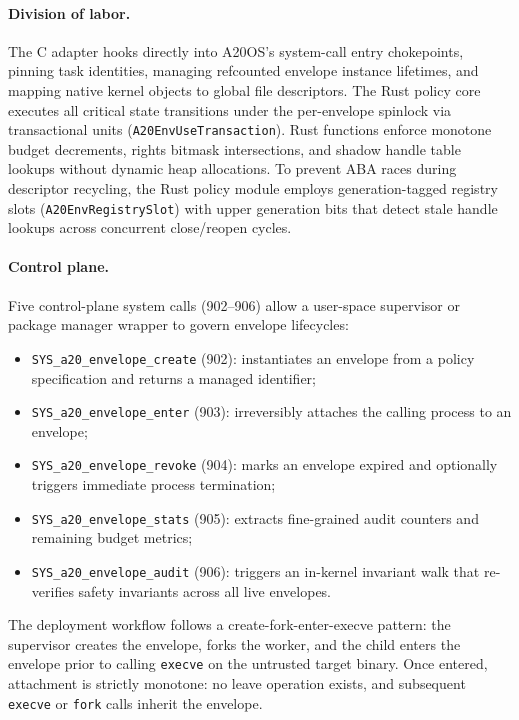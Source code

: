 \documentclass[letterpaper,twocolumn,10pt]{article}
\begin{document}
\paragraph{Division of labor.}
The C adapter hooks directly into A20OS's system-call entry chokepoints, pinning
task identities, managing refcounted envelope instance lifetimes, and mapping
native kernel objects to global file descriptors.  The Rust policy core
executes all critical state transitions under the per-envelope spinlock
via transactional units (\texttt{A20EnvUseTransaction}).  Rust functions enforce
monotone budget decrements, rights bitmask intersections, and shadow handle
table lookups without dynamic heap allocations.  To prevent ABA races during
descriptor recycling, the Rust policy module employs generation-tagged
registry slots (\texttt{A20EnvRegistrySlot}) with upper generation bits that
detect stale handle lookups across concurrent close/reopen cycles.

\paragraph{Control plane.}
Five control-plane system calls (902--906) allow a user-space supervisor or
package manager wrapper to govern envelope lifecycles:
\begin{itemize}
\item \texttt{SYS\_a20\_envelope\_create} (902): instantiates an envelope from a
      policy specification and returns a managed identifier;
\item \texttt{SYS\_a20\_envelope\_enter} (903): irreversibly attaches the calling
      process to an envelope;
\item \texttt{SYS\_a20\_envelope\_revoke} (904): marks an envelope expired and
      optionally triggers immediate process termination;
\item \texttt{SYS\_a20\_envelope\_stats} (905): extracts fine-grained audit counters
      and remaining budget metrics;
\item \texttt{SYS\_a20\_envelope\_audit} (906): triggers an in-kernel invariant walk
      that re-verifies safety invariants across all live envelopes.
\end{itemize}

The deployment workflow follows a create-fork-enter-execve pattern: the
supervisor creates the envelope, forks the worker, and the child enters the
envelope prior to calling \texttt{execve} on the untrusted target binary.  Once
entered, attachment is strictly monotone: no leave operation exists, and
subsequent \texttt{execve} or \texttt{fork} calls inherit the envelope.
\end{document}
